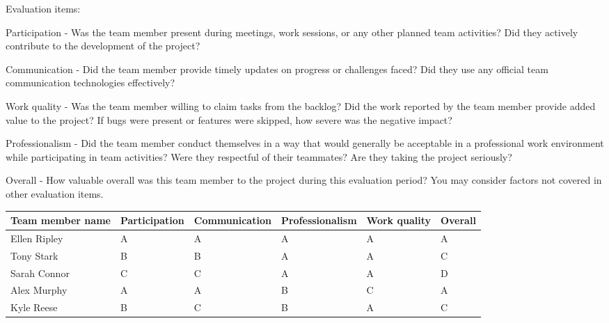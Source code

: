 \documentclass{article}
\begin{document}
Evaluation items:
\begin{itemize}
\begin{item}
Participation - Was the team member present during meetings, work sessions, or any other planned team activities? Did they actively contribute to the development of the project?
\end{item}
\begin{item}
Communication - Did the team member provide timely updates on progress or challenges faced? Did they use any official team communication technologies effectively?
\end{item}
\begin{item}
Work quality - Was the team member willing to claim tasks from the backlog? Did the work reported by the team member provide added value to the project? If bugs were present or features were skipped, how severe was the negative impact?
\end{item}
\begin{item}
Professionalism - Did the team member conduct themselves in a way that would generally be acceptable in a professional work environment while participating in team activities? Were they respectful of their teammates? Are they taking the project seriously?
\end{item}
\begin{item}
Overall - How valuable overall was this team member to the project during this evaluation period? You may consider factors not covered in other evaluation items.
\end{item}
\end{itemize}

\begin{tabular}{| p{1.5in} | >{\centering\arraybackslash} p{} | >{\centering\arraybackslash} p{1.1in} | >{\centering\arraybackslash} p{1.1in}| >{\centering\arraybackslash} p{0.5in}| >{\centering\arraybackslash} p{.5in} |}
\hline
\textbf{Team member name} & \textbf{Participation} & \textbf{Communication} & \textbf{Professionalism} & \textbf{Work quality} & \textbf{Overall} \\ \hline
Ellen Ripley & A & A & A & A & A\\ \hline
Tony Stark & B & B & A & A & C\\ \hline
Sarah Connor & C & C & A & A & D\\ \hline
Alex Murphy & A & A & B & C & A\\ \hline
Kyle Reese & B & C & B & A & C\\ \hline
\end{tabular}
\end{document}
